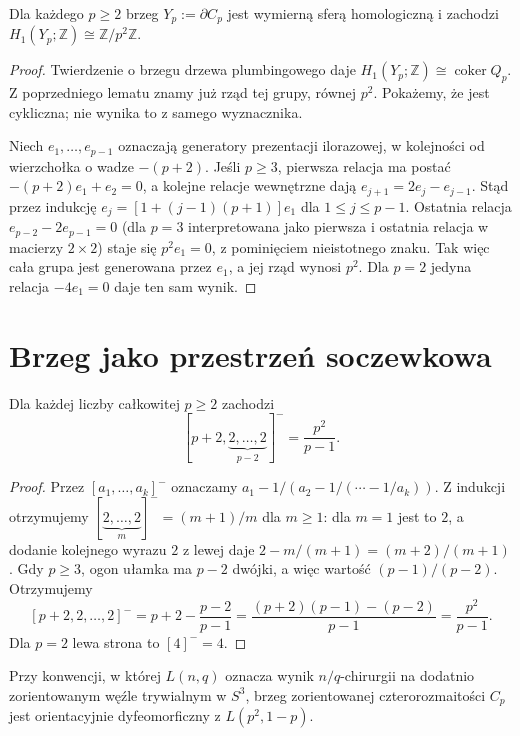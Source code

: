 \begin{twierdzenie}
\label{thm:tg-rb-h1boundary}
Dla każdego $p\geq2$ brzeg $Y_p:=\partial C_p$
jest wymierną sferą homologiczną i zachodzi
$H_1(Y_p;\mathbb Z)\cong\mathbb Z/p^2\mathbb Z$.
\end{twierdzenie}

\begin{proof}
Twierdzenie o brzegu drzewa plumbingowego daje
$H_1(Y_p;\mathbb Z)\cong\operatorname{coker}Q_p$.
Z poprzedniego lematu znamy już rząd tej grupy,
równej $p^2$. Pokażemy, że jest cykliczna;
nie wynika to z samego wyznacznika.

Niech $e_1,\ldots,e_{p-1}$ oznaczają generatory
prezentacji ilorazowej, w kolejności od wierzchołka
o wadze $-(p+2)$. Jeśli $p\geq3$, pierwsza relacja
ma postać $-(p+2)e_1+e_2=0$, a kolejne relacje
wewnętrzne dają $e_{j+1}=2e_j-e_{j-1}$.
Stąd przez indukcję
$e_j=[1+(j-1)(p+1)]e_1$ dla $1\leq j\leq p-1$.
Ostatnia relacja $e_{p-2}-2e_{p-1}=0$
(dla $p=3$ interpretowana jako pierwsza i ostatnia
relacja w macierzy $2\times2$) staje się
$p^2e_1=0$, z pominięciem nieistotnego znaku.
Tak więc cała grupa jest generowana przez $e_1$,
a jej rząd wynosi $p^2$. Dla $p=2$ jedyna relacja
$-4e_1=0$ daje ten sam wynik.
\end{proof}

\section{Brzeg jako przestrzeń soczewkowa}
\label{sec:tg-rb-lens}

\begin{lemat}
\label{lem:tg-rb-cfrac}
Dla każdej liczby całkowitej $p\geq2$ zachodzi
\[
[p+2,\underbrace{2,\ldots,2}_{p-2}]^-
=\frac{p^2}{p-1}.
\]
\end{lemat}

\begin{proof}
Przez $[a_1,\ldots,a_k]^-$ oznaczamy
$a_1-1/(a_2-1/(\cdots-1/a_k))$.
Z indukcji otrzymujemy $[\underbrace{2,\ldots,2}_{m}]^-
=(m+1)/m$ dla $m\geq1$: dla $m=1$ jest to $2$,
a dodanie kolejnego wyrazu $2$ z lewej daje
$2-m/(m+1)=(m+2)/(m+1)$.
Gdy $p\geq3$, ogon ułamka ma $p-2$ dwójki,
a więc wartość $(p-1)/(p-2)$. Otrzymujemy
\[
[p+2,2,\ldots,2]^-
=p+2-\frac{p-2}{p-1}
=\frac{(p+2)(p-1)-(p-2)}{p-1}
=\frac{p^2}{p-1}.
\]
Dla $p=2$ lewa strona to $[4]^-=4$.
\end{proof}

\begin{twierdzenie}
\label{thm:tg-rb-lens}
Przy konwencji, w której $L(n,q)$ oznacza wynik
$n/q$-chirurgii na dodatnio zorientowanym węźle
trywialnym w $S^3$, brzeg zorientowanej
czterorozmaitości $C_p$ jest orientacyjnie
dyfeomorficzny z $L(p^2,1-p)$.
\end{twierdzenie}

